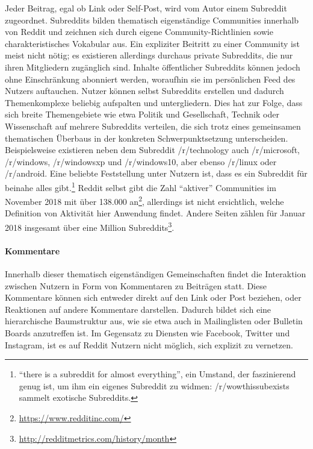 \documentclass[11pt,a4paper,twoside]{article}
\let\rmarkdownfootnote\footnote%
\def\footnote{\protect\rmarkdownfootnote}
\let\oldpar\paragraph
\renewcommand{\paragraph}{\oldpar*}
\begin{document}
Jeder Beitrag, egal ob Link oder Self-Post, wird vom Autor einem
Subreddit zugeordnet. Subreddits bilden thematisch eigenständige
Communities innerhalb von Reddit und zeichnen sich durch eigene
Community-Richtlinien sowie charakteristisches Vokabular aus. Ein
expliziter Beitritt zu einer Community ist meist nicht nötig; es
existieren allerdings durchaus private Subreddits, die nur ihren
Mitgliedern zugänglich sind. Inhalte öffentlicher Subreddits können
jedoch ohne Einschränkung abonniert werden, woraufhin sie im
persönlichen Feed des Nutzers auftauchen. Nutzer können selbst
Subreddits erstellen und dadurch Themenkomplexe beliebig aufspalten und
untergliedern. Dies hat zur Folge, dass sich breite Themengebiete wie
etwa Politik und Gesellschaft, Technik oder Wissenschaft auf mehrere
Subreddits verteilen, die sich trotz eines gemeinsamen thematischen
Überbaus in der konkreten Schwerpunktsetzung unterscheiden.
Beispielsweise existieren neben dem Subreddit /r/technology auch
/r/microsoft, /r/windows, /r/windowsxp und /r/windows10, aber ebenso
/r/linux oder /r/android. Eine beliebte Feststellung unter Nutzern ist,
dass es ein Subreddit für beinahe alles gibt.\footnote{\enquote{there is
  a subreddit for almost everything}, ein Umstand, der faszinierend
  genug ist, um ihm ein eigenes Subreddit zu widmen: /r/wowthissubexists
  sammelt exotische Subreddits.} Reddit selbst gibt die Zahl
\enquote{aktiver} Communities im November 2018 mit über 138.000
an\footnote{\url{https://www.redditinc.com/}}, allerdings ist nicht
ersichtlich, welche Definition von Aktivität hier Anwendung findet.
Andere Seiten zählen für Januar 2018 insgesamt über eine Million
Subreddits\footnote{\url{http://redditmetrics.com/history/month}}.

\hypertarget{kommentare}{%
\paragraph{Kommentare}\label{kommentare}}

Innerhalb dieser thematisch eigenständigen Gemeinschaften findet die
Interaktion zwischen Nutzern in Form von Kommentaren zu Beiträgen statt.
Diese Kommentare können sich entweder direkt auf den Link oder Post
beziehen, oder Reaktionen auf andere Kommentare darstellen. Dadurch
bildet sich eine hierarchische Baumstruktur aus, wie sie etwa auch in
Mailinglisten oder Bulletin Boards anzutreffen ist. Im Gegensatz zu
Diensten wie Facebook, Twitter und Instagram, ist es auf Reddit Nutzern
nicht möglich, sich explizit zu vernetzen.
\end{document}
